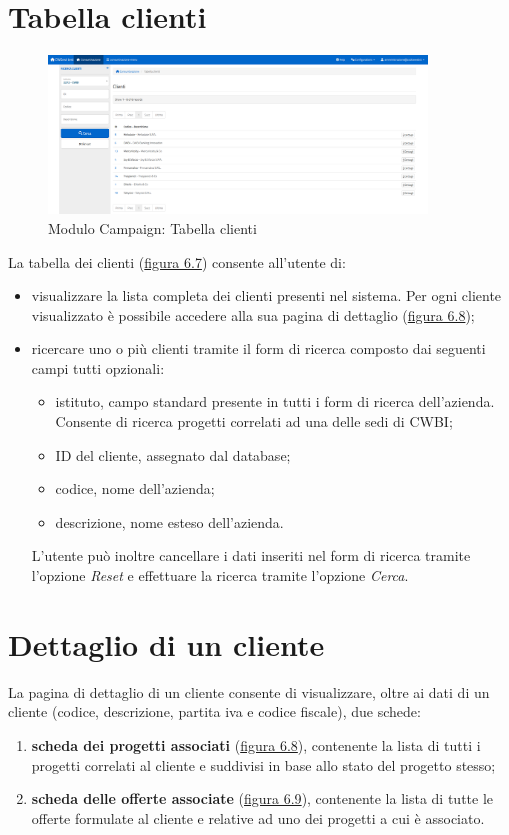 \section{Tabella clienti}
\begin{figure}[!h]
\centering
\includegraphics[width=380px]{../images/UI/08-tabellaClienti.png}
\caption{Modulo Campaign: Tabella clienti}
\label{fig:tabellaClienti}
\end{figure}

\noindent La tabella dei clienti ({\hyperref[fig:tabellaClienti]{figura 6.7}}) consente all'utente di:
\begin{itemize}
\item visualizzare la lista completa dei clienti presenti nel sistema. Per ogni cliente visualizzato è possibile accedere alla sua pagina di dettaglio ({\hyperref[fig:dettaglioCliente1]{figura 6.8}}); 
\item ricercare uno o più clienti tramite il form di ricerca composto dai seguenti campi tutti opzionali:
\begin{itemize}
\item istituto, campo standard presente in tutti i form di ricerca dell'azienda. Consente di ricerca progetti correlati ad una delle sedi di CWBI;
\item ID del cliente, assegnato dal database;
\item codice, nome dell'azienda;
\item descrizione, nome esteso dell'azienda.
\end{itemize}
L'utente può inoltre cancellare i dati inseriti nel form di ricerca tramite l'opzione \textit{Reset} e effettuare la ricerca tramite l'opzione \textit{Cerca}.
\end{itemize}

\section{Dettaglio di un cliente}
\noindent La pagina di dettaglio di un cliente consente di visualizzare, oltre ai dati di un cliente (codice, descrizione, partita iva e codice fiscale), due schede:
\begin{enumerate}
\item \textbf{scheda dei progetti associati} ({\hyperref[fig:dettaglioCliente1]{figura 6.8}}), contenente la lista di tutti i progetti correlati al cliente e suddivisi in base allo stato del progetto stesso;
\item \textbf{scheda delle offerte associate} ({\hyperref[fig:dettaglioCliente2]{figura 6.9}}), contenente la lista di tutte le offerte formulate al cliente e relative ad uno dei progetti a cui è associato.
\end{enumerate}

